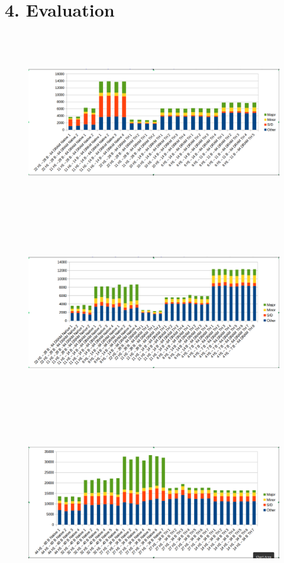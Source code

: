 \documentclass[twocolumn,10pt]{asme2e}
\begin{document}
\section*{4. Evaluation}
\begin{figure}[h!]
	\includegraphics[width=15cm,height=8cm]{lr64.png}
\end{figure}

\begin{figure}[h!]
        \includegraphics[width=15cm,height=8cm]{pr64.png}
\end{figure}

\begin{figure}[h!]
        \includegraphics[width=15cm,height=8cm]{pr256.png}
\end{figure}
\end{document}
